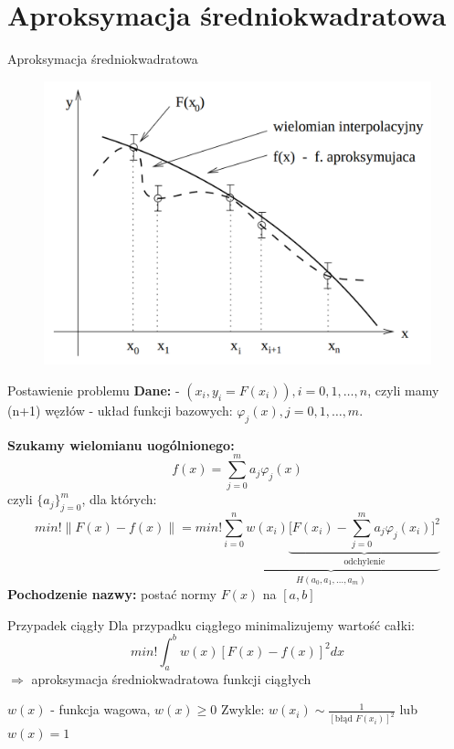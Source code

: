 \section{Aproksymacja średniokwadratowa}
\begin{frame}{Aproksymacja średniokwadratowa}
  	\begin{figure}
	\includegraphics[height=0.8\textheight]{img/5/aproksymacja_sredniokwadratowa}
	\end{figure}
\end{frame}
\begin{frame}{Postawienie problemu}
	\textbf{Dane:}\newline
    - ${(x_i,y_i = F(x_i)),i=0,1,\ldots,n}$, czyli mamy (n+1) węzłów \newline
    - układ funkcji bazowych: $\varphi_j(x), j=0,1,\ldots,m$.\newline\par
    \textbf{Szukamy wielomianu uogólnionego:}
    $$f(x) = \sum_{j = 0}^{m} a_j \varphi_j(x)$$
    czyli $\{{a_j}\}_{j=0}^m$, dla których:
    $$min!\parallel F(x) - f(x) \parallel = min!\underbrace{ \sum_{i=0}^{n}w(x_i)\underbrace{\bigg[F(x_i)-\sum_{j=0}^{m}a_j\varphi_j(x_i)\bigg]^2}_\text{odchylenie}}_{H(a_0,a_1,\ldots,a_m)}$$
    \textbf{Pochodzenie nazwy:} postać normy $F(x)$ na $[a,b]$
\end{frame}
\begin{frame}{Przypadek ciągły}
    Dla przypadku ciągłego minimalizujemy wartość całki:
    $$min!\int_a^bw(x)[F(x)-f(x)]^2dx%
    $$
    $\Rightarrow$ aproksymacja średniokwadratowa funkcji ciągłych\newline

    $w(x)$ - funkcja wagowa, $w(x)\geqslant0$\newline
    Zwykle: $w(x_i) \sim \frac{1}{[\text{błąd }F(x_i)]^2}$ lub $w(x) = 1$
\end{frame}

